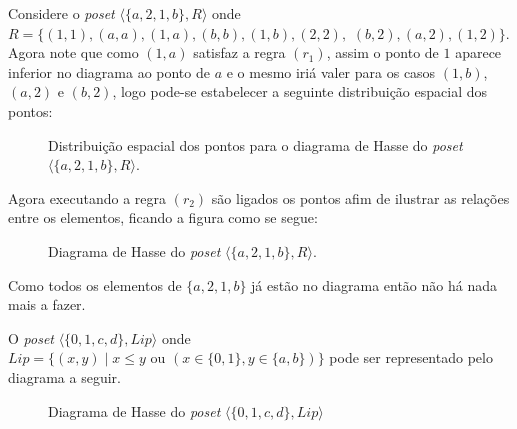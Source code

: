 \begin{example}
	Considere o \textit{poset} $\langle \{a, 2, 1, b\}, R \rangle$ onde $R = \{(1, 1), (a, a), (1, a), (b, b), (1, b), (2, 2),$ $(b, 2), (a, 2), (1, 2)\}$. Agora note que como $(1, a)$ satisfaz a regra $(r_1)$, assim o ponto de $1$ aparece inferior no diagrama ao ponto de $a$ e o mesmo iriá valer para os casos $(1, b)$, $(a, 2)$ e $(b, 2)$, logo pode-se estabelecer a seguinte distribuição espacial dos pontos:
	
	\begin{figure}[h]
		\centering
		\caption{Distribuição espacial dos pontos para o diagrama de Hasse do \textit{poset} $\langle \{a, 2, 1, b\}, R \rangle$.}
		\label{fig:PreDiagramaHasse}
	\end{figure}

	Agora executando a regra $(r_2)$ são ligados os pontos afim de ilustrar as relações entre os elementos, ficando a figura como se segue:
	
	\begin{figure}[h]
		\centering
		\caption{Diagrama de Hasse do \textit{poset} $\langle \{a, 2, 1, b\}, R \rangle$.}
		\label{fig:DiagramaHasse1}
	\end{figure}

	Como todos os elementos de $\{a, 2, 1, b\}$ já estão no diagrama então não há nada mais a fazer.
\end{example}

\begin{example}
	O \textit{poset} $\langle \{0, 1, c, d\}, Lip \rangle$ onde $Lip = \{(x, y) \mid x \leq y \text{ ou } (x \in \{0, 1\}, y \in \{a,b\}) \}$ pode ser representado pelo diagrama a seguir.
	
	\begin{figure}[h]
		\centering
		\caption{Diagrama de Hasse do \textit{poset} $\langle \{0, 1, c, d\}, Lip \rangle$}
		\label{fig:DiagramaHasse2}
	\end{figure}
\end{example}


